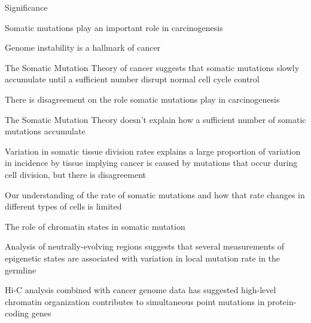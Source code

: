 \begin{outline}
	\item Significance
	\begin{outline}
		\item Somatic mutations play an important role in carcinogenesis
		\begin{outline}
			\item Genome instability is a hallmark of cancer \parencite{hanahan_hallmarks_2000, hanahan_hallmarks_2011}
			\item The Somatic Mutation Theory of cancer suggests that somatic mutations slowly accumulate until a sufficient number disrupt normal cell cycle control \parencite{tomasetti_variation_2015}
			\item There is disagreement on the role somatic mutations play in carcinogenesis \parencite{baker_cancer_2015}
			\begin{outline}
				\item The Somatic Mutation Theory doesn't explain how a sufficient number of somatic mutations accumulate \parencite{baker_cancer_2015}
				\item Variation in somatic tissue division rates explains a large proportion of variation in incidence by tissue \parencite{tomasetti_variation_2015} implying cancer is caused by mutations that occur during cell division, but there is disagreement \parencite{rozhok_critical_2015, wang_implications_2015}
				\item Our understanding of the rate of somatic mutations and how that rate changes in different types of cells is limited \parencite{stratton_cancer_2009}
			\end{outline}
		\end{outline}
		\item The role of chromatin states in somatic mutation
		\begin{outline}
			\item Analysis of neutrally-evolving regions suggests that several measurements of epigenetic states are associated with variation in local mutation rate in the germline \parencite{makova_effects_2015}
			\item Hi-C analysis combined with cancer genome data has suggested high-level chromatin organization contributes to simultaneous point mutations in protein-coding genes \parencite{shi_chromatin_2016}

\end{outline}
\end{outline}
\end{outline}
